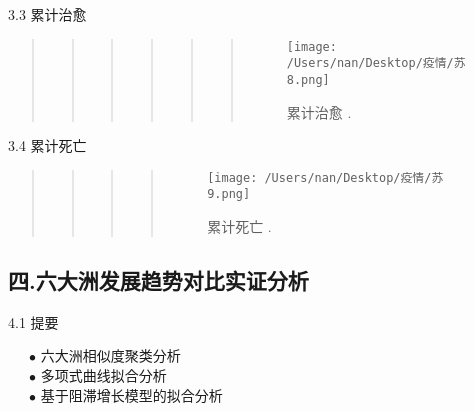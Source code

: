 \documentclass[
  ignorenonframetext,
]{beamer}
\begin{document}
\begin{frame}{3.3 累计治愈}
\protect\hypertarget{section-24}{}

\begin{quote}
\begin{quote}
\begin{quote}
\begin{quote}
\begin{quote}
\begin{quote}
\begin{figure}
\centering
\texttt{[image: /Users/nan/Desktop/疫情/苏8.png]}
\caption{累计治愈 .}
\end{figure}
\end{quote}
\end{quote}
\end{quote}
\end{quote}
\end{quote}
\end{quote}

\end{frame}

\begin{frame}{3.4 累计死亡}
\protect\hypertarget{section-25}{}

\begin{quote}
\begin{quote}
\begin{quote}
\begin{quote}
\begin{figure}
\centering
\texttt{[image: /Users/nan/Desktop/疫情/苏9.png]}
\caption{累计死亡 .}
\end{figure}
\end{quote}
\end{quote}
\end{quote}
\end{quote}

\end{frame}

\hypertarget{section-26}{%
\subsection{四.六大洲发展趋势对比实证分析}\label{section-26}}

\begin{frame}{4.1 提要}
\protect\hypertarget{section-27}{}

  \(\bullet\) 六大洲相似度聚类分析\\
  \(\bullet\) 多项式曲线拟合分析\\
  \(\bullet\) 基于阻滞增长模型的拟合分析

\end{frame}
\end{document}
